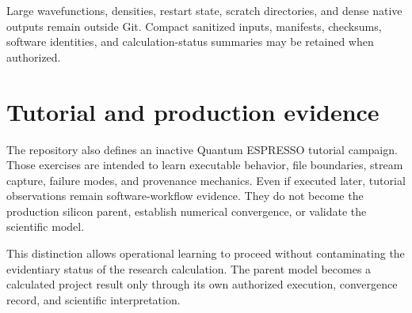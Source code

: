 Large wavefunctions, densities, restart state, scratch directories, and dense
native outputs remain outside Git. Compact sanitized inputs, manifests,
checksums, software identities, and calculation-status summaries may be retained
when authorized.

\section{Tutorial and production evidence}

The repository also defines an inactive Quantum ESPRESSO tutorial campaign.
Those exercises are intended to learn executable behavior, file boundaries,
stream capture, failure modes, and provenance mechanics. Even if executed later,
tutorial observations remain software-workflow evidence. They do not become the
production silicon parent, establish numerical convergence, or validate the
scientific model.

This distinction allows operational learning to proceed without contaminating
the evidentiary status of the research calculation. The parent model becomes a
calculated project result only through its own authorized execution,
convergence record, and scientific interpretation.
